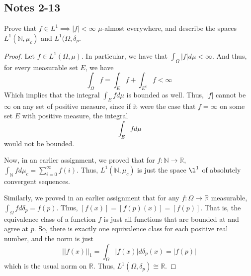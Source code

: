 \documentclass[fontsize=11pt]{scrartcl} %
\numberwithin{equation}{section} %
\numberwithin{figure}{section} %
\numberwithin{table}{section} %
\newcommand{\R}{\mathbb{R}}
\newcommand{\N}{\mathbb{N}}
\begin{document}
\subsection*{Notes 2-13}
Prove that $f\in L^1\implies |f|<\infty$ $\mu$-almost everywhere, and describe the 
spaces $L^1(\N,\mu_c)$ and $L^1(\Omega,\delta_p$.
\\
\begin{proof}
Let $f\in L^1(\Omega,\mu)$. In particular, we have that $\int_{\Omega}|f|d\mu < \infty$.
And thus, for every measurable set $E$, we have
\[
\int_{\Omega} f = \int_E f + \int_{E^c} f < \infty
\]
Which implies that the integral $\int_E fd\mu$ is bounded as well. Thus, $|f|$ cannot
be $\infty$ on any set of positive measure, since if it were the case
that $f=\infty$ on some set $E$ with positive measure, the integral
\[
\int_E fd\mu
\]
would not be bounded.

Now, in an earlier assignment, we proved that for $f:\N\to\R$, $\int_{\N}fd\mu_c = \sum_{i=0}^{\infty}f(i)$.
Thus, $L^1(\N,\mu_c)$ is just the space $\l^1$ of absolutely convergent sequences.

Similarly, we proved in an earlier assignment that for any $f:\Omega\to\R$ measurable,
$\int_{\Omega}fd\delta_p = f(p)$. Thus, $[f(x)] = [f(p)(x)] = [f(p)]$. That is, the 
equivalence class of a function $f$ is just all functions that are bounded at and agree at $p$. So,
there is exactly one equivalence class for each positive real number, and the norm is just
\[
||f(x)||_1 = \int_{\Omega}|f(x)|d\delta_p(x) = |f(p)|
\]
which is the usual norm on $\R$. Thus, $L^1(\Omega,\delta_p) \cong \R$.
\end{proof}
\end{document}
